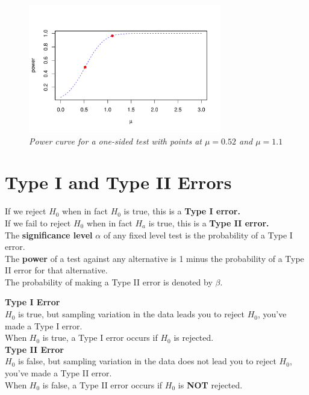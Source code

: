 \begin{example}
\begin{figure}[H]  %
\centering
\includegraphics[width=0.75\textwidth]{section13/images/power_curve.pdf}
\vspace{-10pt}  %
\caption{\textit{Power curve for a one-sided test with points at $\mu = 0.52$ and $\mu = 1.1$}}
\end{figure}
\end{example}
\section{Type I and Type II Errors}

If we reject $H_0$ when in fact $H_0$ is true, this is a \textbf{Type I error.} \\

If we fail to reject $H_0$ when in fact $H_a$ is true, this is a \textbf{Type II error.} \\

The \textbf{significance level} $\alpha$ of any fixed level test is the probability of a Type I error. \\

The \textbf{power} of a test against any alternative is 1 minus the probability of a Type II error for that alternative. \\

The probability of making a Type II error is denoted by $\beta$. 
\begin{tcolorbox}[title=\textbf{Decision Errors in Tests},
  colback=yellow!10,
  colframe=black!45,
  coltitle=black,
  fonttitle=\bfseries,
  breakable]

\textbf{Type I Error} \\
$H_0$ is true, but sampling variation in the data leads you to reject $H_0$, you’ve made a Type I error. \\
When $H_0$ is true, a Type I error occurs if $H_0$ is rejected. \\

\textbf{Type II Error} \\
$H_0$ is false, but sampling variation in the data does not lead you to reject $H_0$, you’ve made a Type II error. \\
When $H_0$ is false, a Type II error occurs if $H_0$ is \textbf{NOT} rejected.

\end{tcolorbox}

